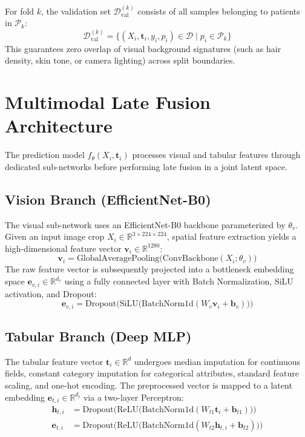 \documentclass[12pt,a4paper]{report}
\begin{document}
	For fold $k$, the validation set $\mathcal{D}_{\text{val}}^{(k)}$ consists of all samples belonging to patients in $\mathcal{P}_k$:
	\begin{equation}
		\mathcal{D}_{\text{val}}^{(k)} = \{(X_i, \mathbf{t}_i, y_i, p_i) \in \mathcal{D} \mid p_i \in \mathcal{P}_k\}
	\end{equation}
	This guarantees zero overlap of visual background signatures (such as hair density, skin tone, or camera lighting) across split boundaries.
	
	\section{Multimodal Late Fusion Architecture}
	The prediction model $f_\theta(X_i, \mathbf{t}_i)$ processes visual and tabular features through dedicated sub-networks before performing late fusion in a joint latent space.
	
	\subsection{Vision Branch (EfficientNet-B0)}
	The visual sub-network uses an EfficientNet-B0 backbone parameterized by $\theta_v$. Given an input image crop $X_i \in \mathbb{R}^{3 \times 224 \times 224}$, spatial feature extraction yields a high-dimensional feature vector $\mathbf{v}_i \in \mathbb{R}^{1280}$:
	\begin{equation}
		\mathbf{v}_i = \text{GlobalAveragePooling}\big(\text{ConvBackbone}(X_i; \theta_v)\big)
	\end{equation}
	The raw feature vector is subsequently projected into a bottleneck embedding space $\mathbf{e}_{v, i} \in \mathbb{R}^{d_v}$ using a fully connected layer with Batch Normalization, SiLU activation, and Dropout:
	\begin{equation}
		\mathbf{e}_{v, i} = \text{Dropout}\Big(\text{SiLU}\big(\text{BatchNorm1d}(W_v \mathbf{v}_i + \mathbf{b}_v)\big)\Big)
	\end{equation}
	
	\subsection{Tabular Branch (Deep MLP)}
	The tabular feature vector $\mathbf{t}_i \in \mathbb{R}^d$ undergoes median imputation for continuous fields, constant category imputation for categorical attributes, standard feature scaling, and one-hot encoding. The preprocessed vector is mapped to a latent embedding $\mathbf{e}_{t, i} \in \mathbb{R}^{d_t}$ via a two-layer Perceptron:
	\begin{align}
		\mathbf{h}_{t, i} &= \text{Dropout}\Big(\text{ReLU}\big(\text{BatchNorm1d}(W_{t1} \mathbf{t}_i + \mathbf{b}_{t1})\big)\Big) \\
		\mathbf{e}_{t, i} &= \text{Dropout}\Big(\text{ReLU}\big(\text{BatchNorm1d}(W_{t2} \mathbf{h}_{t, i} + \mathbf{b}_{t2})\big)\Big)
	\end{align}
	
\end{document}
